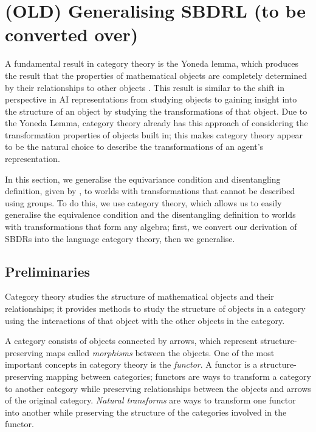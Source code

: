 \chapter{
(OLD) Generalising SBDRL (to be converted over)
}

A fundamental result in category theory is the Yoneda lemma, which produces the result that the properties of mathematical objects are completely determined by their relationships to other objects \autocite{riehl2017category,barr1990category}.
This result is similar to the shift in perspective in AI representations from studying objects to gaining insight into the structure of an object by studying the transformations of that object.
Due to the Yoneda Lemma, category theory already has this approach of considering the transformation properties of objects built in; this makes category theory appear to be the natural choice to describe the transformations of an agent's representation.

In this section, we generalise the equivariance condition and disentangling definition, given by \autocite{Higgins2018}, to worlds with transformations that cannot be described using groups.
To do this, we use category theory, which allows us to easily generalise the equivalence condition and the disentangling definition to worlds with transformations that form any algebra; first, we convert our derivation of SBDRs into the language category theory, then we generalise.

\section{Preliminaries}

Category theory studies the structure of mathematical objects and their relationships; it provides methods to study the structure of objects in a category using the interactions of that object with the other objects in the category.

A category consists of objects connected by arrows, which represent structure-preserving maps called \textit{morphisms} between the objects.
One of the most important concepts in category theory is the \textit{functor}.
A functor is a structure-preserving mapping between categories; functors are ways to transform a category to another category while preserving relationships between the objects and arrows of the original category.
\textit{Natural transforms} are ways to transform one functor into another while preserving the structure of the categories involved in the functor.

